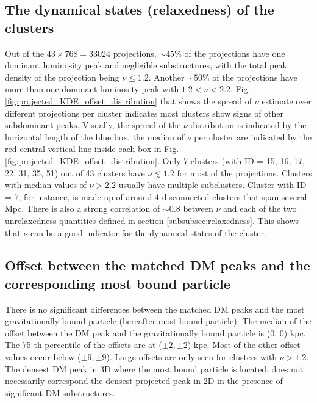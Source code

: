 \subsection{The dynamical states (relaxedness) of the clusters}
Out of the $43 \times 768 = 33 024$ projections, $\sim 45\%$ of the projections 
have one dominant luminosity peak and negligible substructures, with the total peak density of the
projection being $\nu \leq 1.2$. 
Another $\sim 50\%$ of the projections have more than one dominant luminosity
peak with $1.2 < \nu < 2.2$. 
Fig. \ref{fig:projected_KDE_offset_distribution} that shows the spread of $\nu$
estimate over different projections per cluster indicates
most clusters show signs of other subdominant peaks.
Visually, the spread of the $\nu$ distribution is indicated by the horizontal 
length of the blue box. 
the median of $\nu$ per cluster are indicated by the red central vertical line
inside each box in Fig. 
\ref{fig:projected_KDE_offset_distribution}.
Only 7 clusters (with ID = 15, 16, 17, 22, 31, 35, 51) out of 43 clusters have $\nu
\lesssim 1.2$ for most of the projections.
Clusters with median values of $\nu > 2.2$ usually have multiple subclusters.
Cluster with ID = 7, for instance, is made up of around 4 disconnected clusters that span
several Mpc.  
There is also a strong correlation of $\sim 0.8$ between $\nu$ and 
each of the two unrelaxedness quantities defined in section 
\ref{subsubsec:relaxedness}. 
This shows that $\nu$ can be a good indicator for the dynamical states of the
cluster.


\subsection{Offset between the matched DM peaks and the corresponding most
bound particle}
There is no significant differences between the matched DM peaks and 
the most gravitationally 
bound particle (hereafter most bound particle).
The median of the offset between the DM peak and the gravitationally bound
particle is (0, 0) kpc. The 75-th percentile of the offsets are at ($\pm2,\pm2$) kpc. 
Most of the other offset values occur below ($\pm 9, \pm 9$). Large offsets
are only seen for clusters with $\nu > 1.2$. The densest DM peak in 3D where
the most bound particle is located, does not
necessarily correspond the densest projected peak in 2D in the presence of 
significant DM substructures.   

